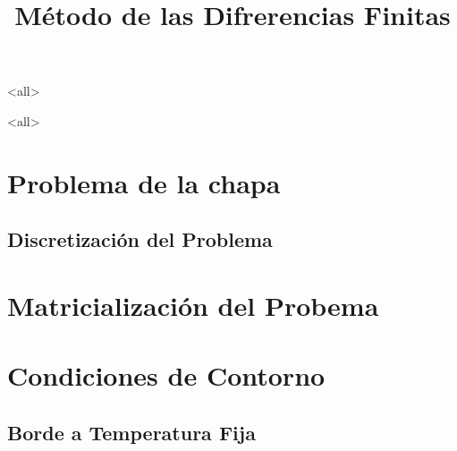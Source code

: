 \mode<all>









\title{
    Método de las Difrerencias Finitas }
\subject{Repaso de Diferencias Finitas, Ayudas para el ejercicio 1 de la guía}



\mode<all>

\section{Problema de la chapa}

\subsection{Discretización del Problema}

\section{Matricialización del Probema}

\section{Condiciones de Contorno}
\subsection{ Borde a Temperatura Fija }

